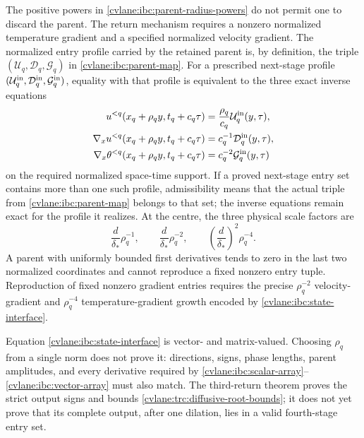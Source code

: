 The positive powers in \eqref{cvlane:ibc:parent-radius-powers} do not permit one
to discard the parent.  The return mechanism requires a nonzero normalized
temperature gradient and a specified normalized velocity gradient.  The
normalized entry profile carried by the retained parent is, by definition,
the triple $(\mathcal U_q,\mathcal D_q,\mathcal G_q)$ in
\eqref{cvlane:ibc:parent-map}.  For a prescribed next-stage profile
$(\mathcal U_q^{\rm in},\mathcal D_q^{\rm in},
\mathcal G_q^{\rm in})$, equality with that profile is equivalent to the
three exact inverse equations
\begin{equation}\label{cvlane:ibc:state-interface}
 \begin{aligned}
 u^{<q}(x_q+\rho_qy,t_q+c_q\tau)
    &=\frac{\rho_q}{c_q}\mathcal U_q^{\rm in}(y,\tau),\\
 \nabla_xu^{<q}(x_q+\rho_qy,t_q+c_q\tau)
    &=c_q^{-1}\mathcal D_q^{\rm in}(y,\tau),\\
 \nabla_x\theta^{<q}(x_q+\rho_qy,t_q+c_q\tau)
    &=c_q^{-2}\mathcal G_q^{\rm in}(y,\tau)
 \end{aligned}
\end{equation}
on the required normalized space-time support.  If a proved next-stage entry
set contains more than one such profile, admissibility means that the actual
triple from \eqref{cvlane:ibc:parent-map} belongs to that set; the inverse equations
remain exact for the profile it realizes.  At the centre, the three physical
scale factors are
\begin{equation}\label{cvlane:ibc:state-powers}
 \frac d{\delta_*}\rho_q^{-1},\qquad
 \frac d{\delta_*}\rho_q^{-2},\qquad
 \left(\frac d{\delta_*}\right)^2\rho_q^{-4}.
\end{equation}
A parent with uniformly bounded first derivatives tends to zero in the last
two normalized coordinates and cannot reproduce a fixed nonzero entry tuple.
Reproduction of fixed nonzero gradient entries requires the precise
$\rho_q^{-2}$ velocity-gradient and $\rho_q^{-4}$ temperature-gradient
growth encoded by \eqref{cvlane:ibc:state-interface}.

Equation \eqref{cvlane:ibc:state-interface} is vector- and matrix-valued.  Choosing
$\rho_q$ from a single norm does not prove it: directions, signs, phase
lengths, parent amplitudes, and every derivative required by
\eqref{cvlane:ibc:scalar-array}--\eqref{cvlane:ibc:vector-array} must also match.  The
third-return theorem proves the strict output signs and bounds
\eqref{cvlane:trc:diffusive-root-bounds}; it does not yet prove that its complete
output, after one dilation, lies in a valid fourth-stage entry set.

